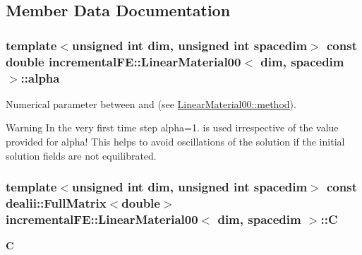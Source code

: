 \subsection{Member Data Documentation}
\subsubsection[{\texorpdfstring{alpha}{alpha}}]{\setlength{\rightskip}{0pt plus 5cm}template$<$unsigned int dim, unsigned int spacedim$>$ const double {\bf incremental\+F\+E\+::\+Linear\+Material00}$<$ dim, spacedim $>$\+::alpha\hspace{0.3cm}{\ttfamily [private]}}\hypertarget{classincremental_f_e_1_1_linear_material00_a81a2c21ea6ca1e039fc4991a2db64cfe}{}\label{classincremental_f_e_1_1_linear_material00_a81a2c21ea6ca1e039fc4991a2db64cfe}
Numerical parameter between {} and {} (see \hyperlink{classincremental_f_e_1_1_linear_material00_abc882081c652f94f40a24eb47da078fa}{Linear\+Material00\+::method}).

\begin{DoxyWarning}{Warning}
In the very first time step {\ttfamily alpha=1.} is used irrespective of the value provided for {\ttfamily alpha!} This helps to avoid oscillations of the solution if the initial solution fields are not equilibrated. 
\end{DoxyWarning}
\subsubsection[{\texorpdfstring{C}{C}}]{\setlength{\rightskip}{0pt plus 5cm}template$<$unsigned int dim, unsigned int spacedim$>$ const dealii\+::\+Full\+Matrix$<$double$>$ {\bf incremental\+F\+E\+::\+Linear\+Material00}$<$ dim, spacedim $>$\+::C\hspace{0.3cm}{\ttfamily [private]}}\hypertarget{classincremental_f_e_1_1_linear_material00_ab1be4c9977c7d6671c5893dbfeb21078}{}\label{classincremental_f_e_1_1_linear_material00_ab1be4c9977c7d6671c5893dbfeb21078}
$\boldsymbol{C}$ 
